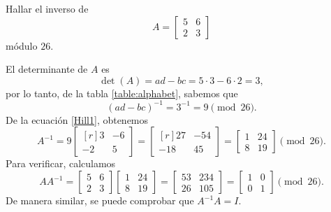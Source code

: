 \begin{examplebox}{}{}
    Hallar el inverso de
    $$A = \begin{bmatrix}
        5 & 6 \\
        2 & 3
    \end{bmatrix}$$
    módulo $26$.

    \tcblower
    \solucion El determinante de $A$ es
    $$\det(A) = ad - bc = 5 \cdot 3 - 6 \cdot 2 = 3,$$
    por lo tanto, de la tabla \ref{table:alphabet}, sabemos que
    $$(ad - bc)^{-1} = 3^{-1} = 9 \pmod{26}.$$
    De la ecuación \eqref{Hill1}, obtenemos
    $$A^{-1} = 9 \begin{bmatrix*}[r]
        3 & -6 \\
        -2 & 5
    \end{bmatrix*} = \begin{bmatrix*}[r]
        27 & -54 \\
        -18 & 45
    \end{bmatrix*} = \begin{bmatrix}
        1 & 24 \\
        8 & 19
    \end{bmatrix} \pmod{26}.$$
    Para verificar, calculamos
    $$AA^{-1} = \begin{bmatrix}
        5 & 6 \\
        2 & 3
    \end{bmatrix} \begin{bmatrix}
        1 & 24 \\
        8 & 19
    \end{bmatrix} = \begin{bmatrix}
        53 & 234 \\
        26 & 105
    \end{bmatrix} = \begin{bmatrix}
        1 & 0 \\
        0 & 1
    \end{bmatrix} \pmod{26}.$$
    De manera similar, se puede comprobar que $A^{-1}A = I$.
\end{examplebox}

